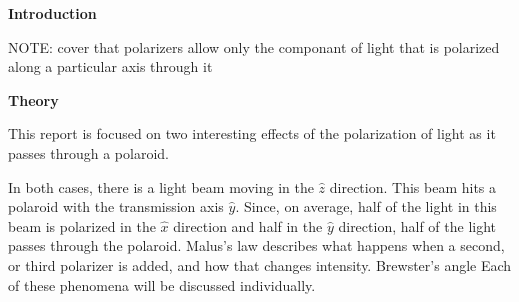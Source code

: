 \documentclass[11pt]{article}
\begin{document}
\begin{multicols}{2}


     \selectfont \textbf{Introduction}
    
     \selectfont 
    


    NOTE: cover that polarizers allow only the componant of light that is polarized along a particular axis through it
    
    \vspace{10pt}

     \selectfont \textbf{Theory}
    
     \selectfont 

    This report is focused on two interesting effects of the polarization of light as it passes through a polaroid.

    In both cases, there is a light beam moving in the $\hat{z}$ direction. This beam hits a polaroid with the transmission axis $\hat{y}$. Since, on average, half of the light in this beam is polarized in the $\hat{x}$ direction and half in the $\hat{y}$ direction, half of the light passes through the polaroid.
    Malus's law describes what happens when a second, or third polarizer is added, and how that changes intensity. 
    Brewster's angle 
    Each of these phenomena will be discussed individually.


\end{multicols}
\end{document}
